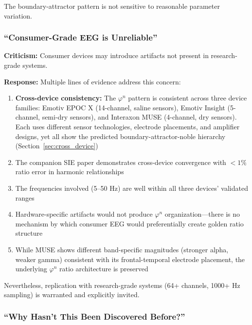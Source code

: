 \documentclass[11pt,a4paper]{article}
\newcommand{\phisym}{\varphi}
\begin{document}
The boundary-attractor pattern is not sensitive to reasonable parameter variation.

\subsubsection{``Consumer-Grade EEG is Unreliable''}

\textbf{Criticism:} Consumer devices may introduce artifacts not present in research-grade systems.

\textbf{Response:} Multiple lines of evidence address this concern:

\begin{enumerate}
    \item \textbf{Cross-device consistency:} The $\phisym^n$ pattern is consistent across three device families: Emotiv EPOC X (14-channel, saline sensors), Emotiv Insight (5-channel, semi-dry sensors), and Interaxon MUSE (4-channel, dry sensors). Each uses different sensor technologies, electrode placements, and amplifier designs, yet all show the predicted boundary-attractor-noble hierarchy (Section~\ref{sec:cross_device})

    \item The companion SIE paper demonstrates cross-device convergence with $<1\%$ ratio error in harmonic relationships

    \item The frequencies involved (5--50 Hz) are well within all three devices' validated ranges

    \item Hardware-specific artifacts would not produce $\phisym^n$ organization---there is no mechanism by which consumer EEG would preferentially create golden ratio structure

    \item While MUSE shows different band-specific magnitudes (stronger alpha, weaker gamma) consistent with its frontal-temporal electrode placement, the underlying $\phisym^n$ ratio architecture is preserved
\end{enumerate}

Nevertheless, replication with research-grade systems (64+ channels, 1000+ Hz sampling) is warranted and explicitly invited.

\subsubsection{``Why Hasn't This Been Discovered Before?''}
\end{document}
